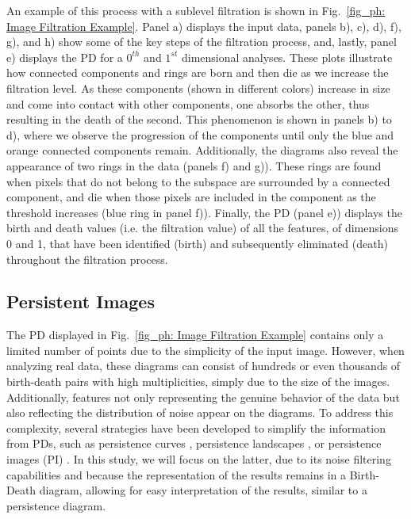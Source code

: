 An example of this process with a sublevel filtration is shown in Fig.~\ref{fig_ph: Image Filtration Example}. Panel a) displays the input data, panels b), c), d), f), g), and h) show some of the key steps of the filtration process, and, lastly, panel e) displays the PD for a $0^{th}$ and $1^{st}$ dimensional analyses. These plots illustrate how connected components and rings are born and then die as we increase the filtration level. As these components (shown in different colors) increase in size and come into contact with other components, one absorbs the other, thus resulting in the death of the second. This phenomenon is shown in panels b) to d), where we observe the progression of the components until only the blue and orange connected components remain. Additionally, the diagrams also reveal the appearance of two rings in the data (panels f) and g)). These rings are found when pixels that do not belong to the subspace are surrounded by a connected component, and die when those pixels are included in the component as the threshold increases (blue ring in panel f)). Finally, the PD (panel e)) displays the birth and death values (i.e. the filtration value) of all the features, of dimensions 0 and 1, that have been identified (birth) and subsequently eliminated (death) throughout the filtration process. 

\subsection{Persistent Images}

The PD displayed in Fig.~\ref{fig_ph: Image Filtration Example} contains only a limited number of points due to the simplicity of the input image. However, when analyzing real data, these diagrams can consist of hundreds or even thousands of birth-death pairs with high multiplicities, simply due to the size of the images. Additionally, features not only representing the genuine behavior of the data but also reflecting the distribution of noise appear on the diagrams. To address this complexity, several strategies have been developed to simplify the information from PDs, such as persistence curves  \citep{persistence_curves}, persistence landscapes \citep{persistence_landscapes}, or persistence images (PI) \citep{persistence_images}. In this study, we will focus on the latter, due to its noise filtering capabilities and because the representation of the results remains in a Birth-Death diagram, allowing for easy interpretation of the results, similar to a persistence diagram.

